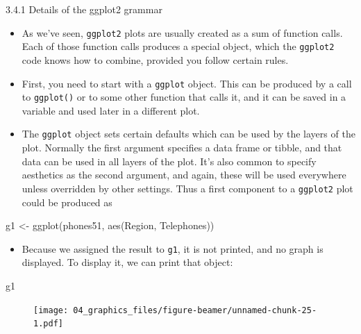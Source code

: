 \documentclass[
  9pt,
  a4paper,
  ignorenonframetext,
  notheorems]{beamer}
\newenvironment{Shaded}{\begin{snugshade}}{\end{snugshade}}
\newcommand{\FunctionTok}[1]{\textcolor[rgb]{0.28,0.35,0.67}{#1}}
\newcommand{\NormalTok}[1]{\textcolor[rgb]{0.00,0.23,0.31}{#1}}
\newcommand{\OtherTok}[1]{\textcolor[rgb]{0.00,0.23,0.31}{#1}}
\providecommand{\tightlist}{%
  \setlength{\itemsep}{0pt}\setlength{\parskip}{0pt}}\usepackage{longtable,booktabs,array}
\begin{document}
\begin{frame}[fragile]
\begin{block}{3.4.1 Details of the ggplot2 grammar}
\protect\hypertarget{details-of-the-ggplot2-grammar}{}
\begin{itemize}
\item
  As we've seen, \texttt{ggplot2} plots are usually created as a sum of
  function calls. Each of those function calls produces a special
  object, which the \texttt{ggplot2} code knows how to combine, provided
  you follow certain rules.
\item
  First, you need to start with a \texttt{ggplot} object. This can be
  produced by a call to \texttt{ggplot()} or to some other function that
  calls it, and it can be saved in a variable and used later in a
  different plot.
\item
  The \texttt{ggplot} object sets certain defaults which can be used by
  the layers of the plot. Normally the first argument specifies a data
  frame or tibble, and that data can be used in all layers of the plot.
  It's also common to specify aesthetics as the second argument, and
  again, these will be used everywhere unless overridden by other
  settings. Thus a first component to a \texttt{ggplot2} plot could be
  produced as
\end{itemize}

\begin{Shaded}
\begin{Highlighting}[]
\NormalTok{g1 }\OtherTok{\textless{}{-}} \FunctionTok{ggplot}\NormalTok{(phones51, }\FunctionTok{aes}\NormalTok{(Region, Telephones))}
\end{Highlighting}
\end{Shaded}

\begin{itemize}
\tightlist
\item
  Because we assigned the result to \texttt{g1}, it is not printed, and
  no graph is displayed. To display it, we can print that object:
\end{itemize}
\end{block}
\end{frame}

\begin{frame}[fragile]
\begin{Shaded}
\begin{Highlighting}[]
\NormalTok{g1}
\end{Highlighting}
\end{Shaded}

\begin{figure}

{\centering \texttt{[image: 04\_graphics\_files/figure-beamer/unnamed-chunk-25-1.pdf]}

}

\end{figure}
\end{frame}
\end{document}
